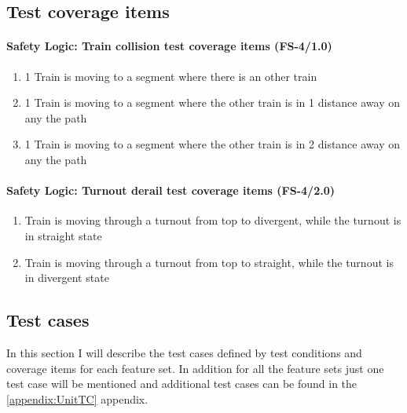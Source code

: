 \subsection{Test coverage items}

\paragraph{Safety Logic: Train collision test coverage items (FS-4/1.0)}
\begin{enumerate}[label=FS-5/1.0-\arabic*, leftmargin=*, format=\small]
	\item 1 Train is moving to a segment where there is an other train
	\item 1 Train is moving to a segment where the other train is in 1 distance away on any the path
	\item 1 Train is moving to a segment where the other train is in 2 distance away on any the path
\end{enumerate}
\paragraph{Safety Logic: Turnout derail test coverage items (FS-4/2.0)}
\begin{enumerate}[label=FS-5/2.0-\arabic*, leftmargin=*, format=\small]
	\item Train is moving through a turnout from top to divergent, while the turnout is in straight state
	\item Train is moving through a turnout from top to straight, while the turnout is in divergent state
\end{enumerate}

\subsection{Test cases}\label{section:UnitTestCases}
In this section I will describe the test cases defined by test conditions and coverage items for each feature set. In addition for all the feature sets just one test case will be mentioned and additional test cases can be found in the \ref{appendix:UnitTC} appendix.
